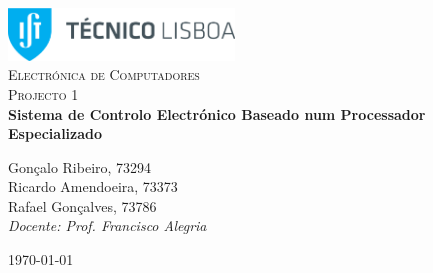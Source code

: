 \begin{titlepage}

	\begin{center}

		\includegraphics[width=6cm]{./title}\\[3cm]

		\textsc{\LARGE Electrónica de Computadores}\\[1.5cm]

		\textsc{\Large Projecto 1}\\[1.5cm]


		{ \huge \bfseries Sistema de Controlo Electrónico Baseado num Processador Especializado \\[2.5cm] }


		\noindent
		\begin{center} \large
			Gonçalo Ribeiro, 73294\\[5mm]

			Ricardo Amendoeira, 73373\\[5mm]

			Rafael Gonçalves, 73786\\[2.5cm]

			\textit{Docente: Prof. Francisco Alegria}

		\end{center}

		\vfill

		{\large \today}

	\end{center}

\end{titlepage}